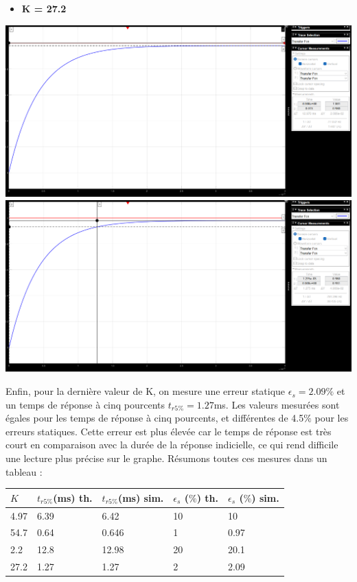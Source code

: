 \documentclass[12pt]{article}
\begin{document}
\newpage\begin{itemize}
    \item \bf \large K = 27.2
\end{itemize}
\begin{center}
    \includegraphics[width = 16 cm]{TP2 Simulink/Syst_1/err_stat_syst_1_K=27.2.png}
    \includegraphics[width = 16 cm]{TP2 Simulink/Syst_1/tr5prct_syst_1_K=27.2.png}
\end{center}
\normalsize Enfin, pour la dernière valeur de K, on mesure une erreur statique $\epsilon_s = 2.09\%$ et un temps de réponse à cinq pourcents $t_{r5\%} = 1.27$ms.
Les valeurs mesurées sont égales pour les temps de réponse à cinq pourcents, et différentes de 4.5$\%$ pour les erreurs statiques. Cette erreur est plus élevée car le temps de réponse est très court en comparaison avec la durée de la réponse indicielle, ce qui rend difficile une lecture plus précise sur le graphe.
\newpage
Résumons toutes ces mesures dans un tableau : 
\begin{center}
    \begin{tabular}{ |p{1cm}|p{2.5cm}|p{2.5cm}|p{2.5cm}|p{2.5cm}|}

        \hline
        $K$ & \normalsize  $t_{r5\%}$(ms) th. & $t_{r5\%}$(ms) sim. & $\epsilon_s$ ($\%$) th. & $\epsilon_s$ ($\%$) sim.\\
        \hline
        4.97 & 6.39 & 6.42 & 10 & 10\\
        54.7 & 0.64 & 0.646 & 1 & 0.97\\
        2.2& 12.8 & 12.98 & 20 & 20.1\\
        27.2 & 1.27 & 1.27 & 2 & 2.09\\
        
        
        \hline
        \end{tabular}
    \end{center}
\end{document}
